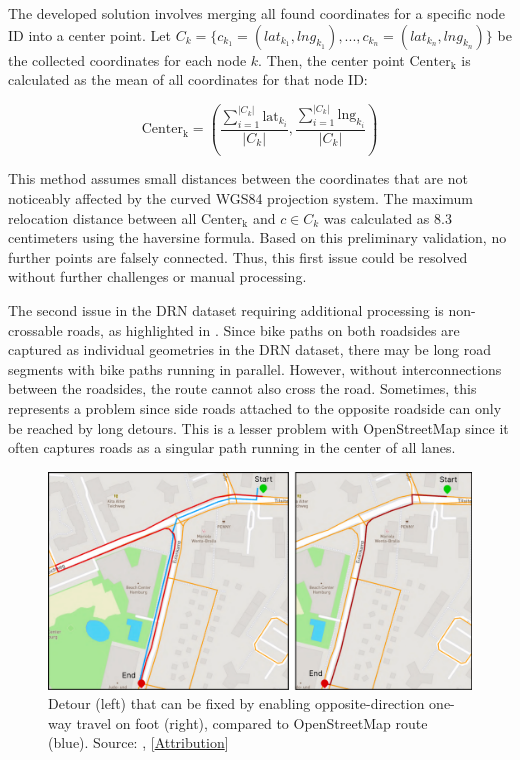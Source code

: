 The developed solution involves merging all found coordinates for a specific node ID into a center point. Let $C_k = \{c_{k_1} = (lat_{k_1}, lng_{k_1}), \text{...} , c_{k_n} = (lat_{k_n}, lng_{k_n})\}$ be the collected coordinates for each node $k$. Then, the center point $\text{Center}_{\text{k}}$ is calculated as the mean of all coordinates for that node ID:

\begin{equation}\text{Center}_{\text{k}} = \left(\frac{\sum_{i=1}^{|C_k|} \text{{lat}}_{k_i}}{|C_k|}, \frac{\sum_{i=1}^{|C_k|} \text{{lng}}_{k_i}}{|C_k|}\right)\end{equation}

This method assumes small distances between the coordinates that are not noticeably affected by the curved WGS84 projection system. The maximum relocation distance between all $\text{Center}_{\text{k}}$ and $c \in C_k$ was calculated as 8.3 centimeters using the haversine formula. Based on this preliminary validation, no further points are falsely connected. Thus, this first issue could be resolved without further challenges or manual processing.

The second issue in the DRN dataset requiring additional processing is non-crossable roads, as highlighted in . Since bike paths on both roadsides are captured as individual geometries in the DRN dataset, there may be long road segments with bike paths running in parallel. However, without interconnections between the roadsides, the route cannot also cross the road. Sometimes, this represents a problem since side roads attached to the opposite roadside can only be reached by long detours. This is a lesser problem with OpenStreetMap since it often captures roads as a singular path running in the center of all lanes.

\begin{figure}[htbp]
\centering
\includegraphics[width=\linewidth]{images/oneway-travel-fix.pdf}
\caption{Detour (left) that can be fixed by enabling opposite-direction one-way travel on foot (right), compared to OpenStreetMap route (blue). Source: \cite{lorenz_2022}, [\hyperref[attribution]{Attribution}]}
\label{fig:oneway-travel-fix}
\end{figure}

